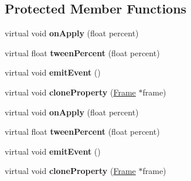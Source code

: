 \subsection*{Protected Member Functions}
\begin{DoxyCompactItemize}
\item 
\mbox{\label{classFrame_a80eb6aeac2a02d444b3c900c0518f070}} 
virtual void {\bfseries on\+Apply} (float percent)
\item 
\mbox{\label{classFrame_a363f9af6a3242b376b984e216a180cff}} 
virtual float {\bfseries tween\+Percent} (float percent)
\item 
\mbox{\label{classFrame_a7187da9a9375a5140793b96075c48cb4}} 
virtual void {\bfseries emit\+Event} ()
\item 
\mbox{\label{classFrame_a639627a5f35d7759df018704d3c90890}} 
virtual void {\bfseries clone\+Property} (\hyperlink{classFrame}{Frame} $\ast$frame)
\item 
\mbox{\label{classFrame_a80eb6aeac2a02d444b3c900c0518f070}} 
virtual void {\bfseries on\+Apply} (float percent)
\item 
\mbox{\label{classFrame_a3f227bfee731e0547c79dbe791b4f554}} 
virtual float {\bfseries tween\+Percent} (float percent)
\item 
\mbox{\label{classFrame_a15b5f27c49bf48d3330797d206425428}} 
virtual void {\bfseries emit\+Event} ()
\item 
\mbox{\label{classFrame_a8a84a380a8a65d85c59cc101d7ee93ac}} 
virtual void {\bfseries clone\+Property} (\hyperlink{classFrame}{Frame} $\ast$frame)
\end{DoxyCompactItemize}
